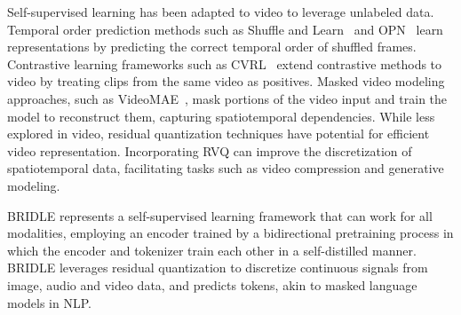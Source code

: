Self-supervised learning has been adapted to video to leverage unlabeled data. Temporal order prediction methods such as Shuffle and Learn~\cite{misra2016shuffle} and OPN~\cite{lee2017unsupervised} learn representations by predicting the correct temporal order of shuffled frames. Contrastive learning frameworks such as CVRL~\cite{qian2021spatiotemporal} extend contrastive methods to video by treating clips from the same video as positives. Masked video modeling approaches, such as VideoMAE~\cite{tong2022videomae}, mask portions of the video input and train the model to reconstruct them, capturing spatiotemporal dependencies.
While less explored in video, residual quantization techniques have potential for efficient video representation. Incorporating RVQ can improve the discretization of spatiotemporal data, facilitating tasks such as video compression and generative modeling.

BRIDLE represents a self-supervised learning framework that can work for all modalities, employing an encoder trained by a bidirectional pretraining process in which the encoder and tokenizer train each other in a self-distilled manner. BRIDLE leverages residual quantization to discretize continuous signals from image, audio and video data, and predicts tokens, akin to masked language models in NLP.

